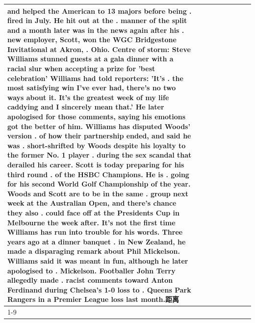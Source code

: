 \begin{table}[H]
\begin{tabular}{lllrlllll}
and helped the American to 13 majors before being . fired in July. He hit out at the . manner of the split and a month later was in the news again after his . new employer, Scott, won the WGC Bridgestone Invitational at Akron, . Ohio. Centre of storm: Steve Williams stunned guests at a gala dinner with a racial slur when accepting a prize for 'best celebration' Williams had told reporters: 'It's . the most satisfying win I've ever had, there's no two ways about it. It's the greatest week of my life caddying and I sincerely mean that.' He later apologised for those comments, saying his emotions got the better of him. Williams has disputed Woods' version . of how their partnership ended, and said he was . short-shrifted by Woods despite his loyalty to the former No. 1 player . during the sex scandal that derailed his career. Scott is today preparing for his third round . of the HSBC Champions. He is . going for his second World Golf Championship of the year. Woods and Scott are to be in the same . group next week at the Australian Open, and there's chance they also . could face off at the Presidents Cup in Melbourne the week after. It's not the first time Williams has run into trouble for his words. Three years ago at a dinner banquet . in New Zealand, he made a disparaging remark about Phil Mickelson. Williams said it was meant in fun, although he later apologised to . Mickelson. Footballer John Terry allegedly made . racist comments toward Anton Ferdinand during Chelsea's 1-0 loss to . Queens Park Rangers in a Premier League loss last month.距离 \\
\cline{1-9}

\end{tabular}
\end{table}
